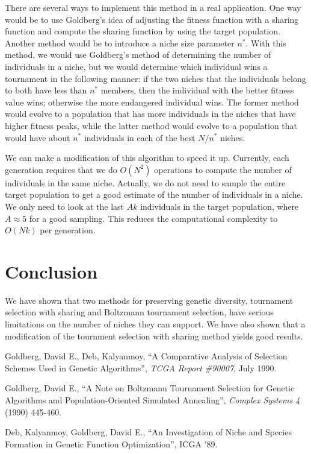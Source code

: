 There are several ways to implement this method in a real application.
One way would be to use Goldberg's idea of adjusting the fitness function
with a sharing function and compute the sharing function by using the
target population.  Another method would be to introduce a niche size parameter
$n^*$.  With this method, we would use Goldberg's method of determining
the number of individuals in a niche, but we would determine which individual
wins a tournament in the following manner: if the two niches that the
individuals belong to both have less than $n^*$ members, then the individual
with the better fitness value wins; otherwise the more endangered
individual wins.  The former method would evolve to a population that
has more individuals in the niches that have higher fitness peaks, while the
latter method would evolve to a population that would have about $n^*$
individuals in each of the best $N/n^*$ niches.

We can make a modification of this algorithm to speed it up.  Currently,
each generation requires that we do $O(N^2)$ operations to compute the
number of individuals in the same niche.  Actually, we do not need to
sample the entire target population to get a good estimate of the number
of individuals in a niche.  We only need to look at the last $A k$
individuals in the target population, where $A\approx 5$ for a good
sampling.  This reduces the computational complexity to $O(N k)$ per
generation.

\section{Conclusion}
We have shown that two methods for preserving genetic diversity,
tournament selection with sharing and Boltzmann tournament selection,
have serious limitations on the number of niches they can support.
We have also shown that a modification of the tournment selection with
sharing method yields good results.

\begin{thebibliography}{9}
 Goldberg, David E., Deb, Kalyanmoy, ``A
Comparative Analysis of Selection Schemes Used in Genetic Algorithms'',
{\em TCGA Report \#90007}, July 1990.

 Goldberg, David E., ``A Note on Boltzmann Tournament
Selection for Genetic Algorithms and Population-Oriented Simulated Annealing'',
{\em Complex Systems 4} (1990) 445-460.

 Deb, Kalyanmoy, Goldberg, David E., ``An Investigation of
Niche and Species Formation in Genetic Function Optimization'',
ICGA '89.

\end{thebibliography}



